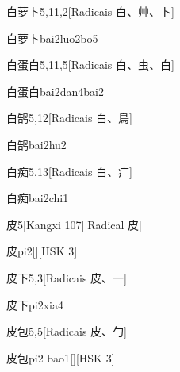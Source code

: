\begin{entry}{白萝卜}{5,11,2}[Radicais ⽩、⾋、⼘]
  \begin{phonetics}{白萝卜}{bai2luo2bo5}
  \end{phonetics}
\end{entry}

\begin{entry}{白蛋白}{5,11,5}[Radicais ⽩、⾍、⽩]
  \begin{phonetics}{白蛋白}{bai2dan4bai2}
  \end{phonetics}
\end{entry}

\begin{entry}{白鹄}{5,12}[Radicais ⽩、⿃]
  \begin{phonetics}{白鹄}{bai2hu2}
  \end{phonetics}
\end{entry}

\begin{entry}{白痴}{5,13}[Radicais ⽩、⽧]
  \begin{phonetics}{白痴}{bai2chi1}
  \end{phonetics}
\end{entry}

\begin{entry}{皮}{5}[Kangxi 107][Radical ⽪]
  \begin{phonetics}{皮}{pi2}[][HSK 3]
  \end{phonetics}
\end{entry}

\begin{entry}{皮下}{5,3}[Radicais ⽪、⼀]
  \begin{phonetics}{皮下}{pi2xia4}
  \end{phonetics}
\end{entry}

\begin{entry}{皮包}{5,5}[Radicais ⽪、⼓]
  \begin{phonetics}{皮包}{pi2 bao1}[][HSK 3]
  \end{phonetics}
\end{entry}

